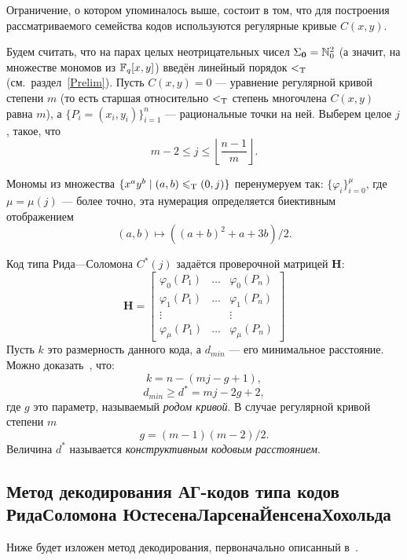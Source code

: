 \documentclass[14pt]{extarticle}
\begin{document}
Ограничение, о котором упоминалось выше, состоит в том, что для построения
рассматриваемого семейства кодов используются регулярные кривые $C(x, y)$.

Будем считать, что на парах целых неотрицательных чисел $\Sigma_{\boldsymbol{0}}=\mathbb N_0^2$ (а
значит, на множестве мономов из $\mathbb F_q[x,y]$) введён линейный порядок $<_{\textrm T}$
(см.~раздел~\ref{Prelim}). Пусть $C(x,y)=0$ — уравнение регулярной кривой
степени $m$ (то есть старшая относительно $<_{\textrm T}$ степень многочлена $C(x,y)$
равна $m$), а $\{P_i=(x_i,y_i)\}_{i=1}^n$ — рациональные точки на ней. Выберем
целое $j$, такое, что $$m-2 \leq j \leq \left\lfloor \frac{n-1}{m}
\right\rfloor.$$

Мономы из множества $\{x^a y^b \mid (a,b) \leqslant_{\textrm T} (0,j)\}$ перенумеруем так:
$\{\varphi_i\}_{i=0}^\mu$, где $\mu=\mu(j)$ --- более точно, эта нумерация 
определяется биективным отображением
\begin{equation}\label{CantorsNumb}
	(a,b) \mapsto ((a+b)^2 + a + 3b)/2.
\end{equation}

Код типа Рида—Соломона $C^*(j)$ задаётся проверочной матрицей $\mathbf H$:
\begin{equation} \mathbf H =
    \begin{bmatrix}
        \varphi_0(P_1)  & \ldots    & \varphi_0(P_n)\\
        \varphi_1(P_1)  & \ldots    & \varphi_1(P_n)\\
        \vdots          &           & \vdots\\
        \varphi_\mu(P_1)& \ldots    & \varphi_\mu(P_n)
    \end{bmatrix}
\end{equation}
Пусть $k$ это размерность данного кода, а $d_{min}$ — его минимальное
расстояние. Можно доказать~\cite{Justesen89}, что:
$$ k = n - (mj - g + 1),$$
$$ d_{min} \geq d^* = mj - 2g + 2,$$
где $g$ это параметр, называемый \emph{родом кривой}. В случае регулярной кривой
степени $m$ $$g=(m-1)(m-2)/2.$$ Величина $d^*$ называется \emph{конструктивным
кодовым расстоянием}.

\subsection{Метод декодирования АГ-кодов типа кодов Рида\emd Соломона Юс\-те\-се\-на\emd Лар\-се\-на\emd Йен\-се\-на\emd Хо\-холь\-да}
\label{DecodingMethod}

Ниже будет изложен метод декодирования, первоначально описанный в~\cite{Justesen92}.
\end{document}
